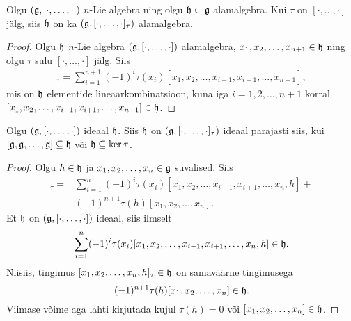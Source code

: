 \begin{lau}\label{lause:indutseeritud-alamalgebra}
    Olgu $(\mathfrak{g}, [\cdot, \dots, \cdot])$ $n$-Lie algebra ning olgu
    $\mathfrak{h} \subset \mathfrak{g}$ alamalgebra. Kui $\tau$ on $[\cdot, \dots, \cdot]$ jälg,
    siis $\mathfrak{h}$ on ka $(\mathfrak{g}, [\cdot, \dots, \cdot]_\tau)$ alamalgebra.
\end{lau}

\begin{proof}
    Olgu $\mathfrak{h}$ $n$-Lie algebra $(\mathfrak{g}, [\cdot, \dots, \cdot])$ alamalgebra,
    $x_1, x_2, \dots, x_{n+1} \in \mathfrak{h}$ ning olgu $\tau$ sulu
    $[\cdot, \dots, \cdot]$ jälg. Siis
    \begin{align*}
        [x_1, x_2, \dots, x_{n+1}]_\tau =  \sum_{i=1}^{n+1} (-1)^i \tau(x_i)
        [x_1, x_2, \dots, x_{i-1}, x_{i+1}, \dots, x_{n+1}],
    \end{align*}
    mis on $\mathfrak{h}$ elementide lineaarkombinatsioon, kuna iga
    $i = 1, 2, \dots, n+1$ korral
    $[x_1, x_2, \dots, x_{i-1}, x_{i+1}, \dots, x_{n+1}] \in \mathfrak{h}$.
\end{proof}

\begin{lau}\label{lause:indutseeritud-ideaal}
    Olgu $(\mathfrak{g}, [\cdot, \dots, \cdot])$ ideaal $\mathfrak{h}$. Siis $\mathfrak{h}$ on
    $(\mathfrak{g}, [\cdot, \dots, \cdot]_\tau)$ ideaal parajasti siis, kui
    $[\mathfrak{g}, \mathfrak{g}, \dots, \mathfrak{g}] \subseteq \mathfrak{h}$ või $\mathfrak{h} \subseteq \ker \tau$.
\end{lau}

\begin{proof}
    Olgu $h \in \mathfrak{h}$ ja $x_1, x_2, \dots, x_n \in \mathfrak{g}$ suvalised. Siis
    \begin{align*}
        [x_1, x_2, \dots, x_n, h]_\tau =  &\sum_{i=1}^{n} (-1)^i \tau(x_i)
        [x_1, x_2, \dots, x_{i-1}, x_{i+1}, \dots, x_n, h] + \\
        &(-1)^{n+1} \tau(h) [x_1, x_2, \dots, x_n].
    \end{align*}
    Et $\mathfrak{h}$ on $(\mathfrak{g}, [\cdot, \dots, \cdot])$ ideaal, siis ilmselt
    \begin{align*}
        \sum_{i=1}^{n} (-1)^i \tau(x_i)
        [x_1, x_2, \dots, x_{i-1}, x_{i+1}, \dots, x_n, h] \in \mathfrak{h}.
    \end{align*}
    Niisiis, tingimus $[x_1, x_2, \dots, x_n, h]_\tau \in \mathfrak{h}$ on
    samaväärne tingimusega
    \[ (-1)^{n+1} \tau(h) [x_1, x_2, \dots, x_n] \in \mathfrak{h}. \]
    Viimase võime aga lahti kirjutada kujul
    $\tau(h) = 0$ või $[x_1, x_2, \dots, x_n] \in \mathfrak{h}$.
\end{proof}

